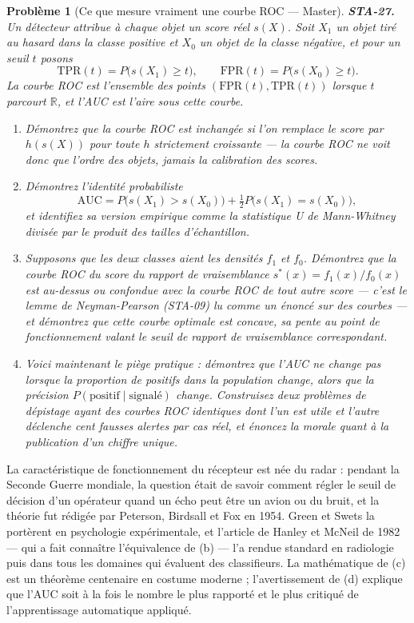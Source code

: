 \documentclass[11pt]{article}
\newtheorem{problem}{Problème}
\begin{document}
\begin{problem}[{Ce que mesure vraiment une courbe ROC --- Master}]
\textbf{STA-27.} Un détecteur attribue à chaque objet un score réel $ s(X) $. Soit $ X_1 $
un objet tiré au hasard dans la classe positive et $ X_0 $ un objet de la classe négative, et
pour un seuil $ t $ posons
\[ \mathrm{TPR}(t) = P\big(s(X_1) \ge t\big), \qquad
 \mathrm{FPR}(t) = P\big(s(X_0) \ge t\big) . \]
La courbe ROC est l'ensemble des points $ (\mathrm{FPR}(t), \mathrm{TPR}(t)) $ lorsque $ t $
parcourt $ \mathbb{R} $, et l'AUC est l'aire sous cette courbe.
\begin{enumerate}
\item[(a)] Démontrez que la courbe ROC est inchangée si l'on remplace le score par $ h(s(X)) $ pour
toute $ h $ strictement croissante --- la courbe ROC ne voit donc que l'ordre des objets, jamais la
calibration des scores.
\item[(b)] Démontrez l'identité probabiliste
\[ \mathrm{AUC} = P\big( s(X_1) >s(X_0) \big) + \tfrac12 P\big( s(X_1) = s(X_0) \big) , \]
et identifiez sa version empirique comme la statistique U de Mann-Whitney divisée par le produit
des tailles d'échantillon.
\item[(c)] Supposons que les deux classes aient les densités $ f_1 $ et $ f_0 $. Démontrez que la
courbe ROC du score du rapport de vraisemblance $ s^*(x) = f_1(x)/f_0(x) $ est au-dessus ou
confondue avec la courbe ROC de tout autre score --- c'est le lemme de Neyman-Pearson (STA-09) lu
comme un énoncé sur des courbes --- et démontrez que cette courbe optimale est concave, sa pente au
point de fonctionnement valant le seuil de rapport de vraisemblance correspondant.
\item[(d)] Voici maintenant le piège pratique : démontrez que l'AUC ne change pas lorsque la proportion de
positifs dans la population change, alors que la précision
$ P(\text{positif} \mid \text{signalé}) $ change. Construisez deux problèmes de dépistage ayant
des courbes ROC identiques dont l'un est utile et l'autre déclenche cent fausses alertes par cas
réel, et énoncez la morale quant à la publication d'un chiffre unique.
\end{enumerate}

\end{problem}

\noindent La caractéristique de fonctionnement du récepteur est née du radar : pendant la
Seconde Guerre mondiale, la question était de savoir comment régler le seuil de décision d'un
opérateur quand un écho peut être un avion ou du bruit, et la théorie fut rédigée par Peterson,
Birdsall et Fox en 1954. Green et Swets la portèrent en psychologie expérimentale, et l'article de
Hanley et McNeil de 1982 --- qui a fait connaître l'équivalence de (b) --- l'a rendue standard en
radiologie puis dans tous les domaines qui évaluent des classifieurs. La mathématique de (c) est un
théorème centenaire en costume moderne ; l'avertissement de (d) explique que l'AUC soit à la fois le
nombre le plus rapporté et le plus critiqué de l'apprentissage automatique appliqué.
\end{document}
